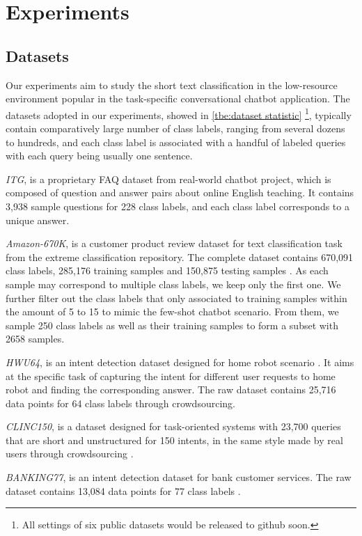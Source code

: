 \section{Experiments}
\label{sec:exp}

\subsection{Datasets}
Our experiments aim to study the short text classification in the low-resource environment popular in the task-specific conversational chatbot application.
The datasets adopted in our experiments, showed in \ref{tbe:dataset statistic} \footnote{All settings of six public datasets would be released to github soon.}, typically contain comparatively large number of class labels, ranging from several dozens to hundreds, and each class label is associated with a handful of labeled queries with each query being usually one sentence. 

\emph{ITG}, is a proprietary FAQ dataset from real-world
chatbot project, which is composed of question and answer pairs about online
English teaching. It contains 3,938 sample questions for 228 class labels, and
each class label corresponds to a unique answer.

\emph{Amazon-670K}, is a customer product review dataset for
text classification task from the extreme classification repository. The
complete dataset contains 670,091 class labels, 285,176 training samples and
150,875 testing samples \cite{bhatia2016extreme}. As each sample may
correspond to multiple class labels, we keep only the first one. We further
filter out the class labels that only associated to training samples within the amount of 5 to 15 to mimic the few-shot chatbot scenario. From them, we sample 250 class
labels as well as their training samples to form a subset with 2658 samples.

\emph{HWU64}, is an intent detection dataset designed for
home robot scenario \cite{liu2019benchmarking}. It aims at the specific task
of capturing the intent for different user requests to home robot and
finding the corresponding answer. The raw dataset contains 25,716 data points
for 64 class labels through crowdsourcing.

\emph{CLINC150}, is a dataset designed for task-oriented
systems with 23,700 queries that are short and unstructured for 150 intents,
in the same style made by real users through crowdsourcing
\cite{larson2019evaluation}.

\emph{BANKING77}, is an intent detection dataset for bank
customer services. The raw dataset contains 13,084 data points for 77 class
labels \cite{casanueva2020efficient}.

